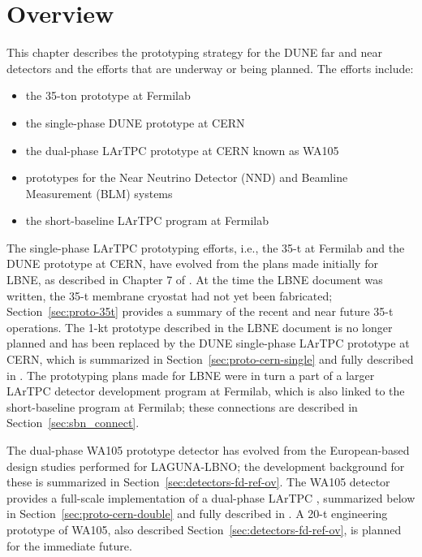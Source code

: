 \section{Overview}
\label{sec:proto-overview}


This chapter describes the prototyping strategy for the DUNE  far and near detectors and the efforts that are underway or being planned.  The efforts include:

\begin{itemize}
\item the 35-ton prototype at Fermilab
\item the single-phase DUNE prototype at CERN
\item the dual-phase LArTPC prototype at CERN known as WA105
\item prototypes for the Near Neutrino Detector (NND) and Beamline Measurement (BLM) systems
\item the short-baseline LArTPC program at Fermilab
\end{itemize}

The single-phase LArTPC prototyping efforts, i.e., the 35-t at Fermilab and the DUNE prototype at CERN, have evolved from the plans made initially for LBNE, as described in Chapter 7 of \anxlbnefd.  At the time the LBNE document was written, the 35-t membrane cryostat had not yet been fabricated; Section~\ref{sec:proto-35t} provides a summary of the recent and near future 35-t operations.  The 1-kt prototype described in the LBNE document is no longer planned and has been replaced by the DUNE single-phase LArTPC prototype at CERN, which is summarized in Section~\ref{sec:proto-cern-single} and fully described in \anxcernproto.  The prototyping plans made for LBNE were in turn a part of a larger LArTPC detector development program at Fermilab, which is also linked to the short-baseline program at Fermilab; these connections are described in Section~\ref{sec:sbn_connect}.

The dual-phase WA105 prototype detector has evolved from the European-based design studies performed for LAGUNA-LBNO; the development background for these is summarized %
in Section~\ref{sec:detectors-fd-ref-ov}.  The WA105 detector provides a full-scale implementation of a dual-phase LArTPC , summarized below in Section~\ref{sec:proto-cern-double} and fully described in  \anxdualtdr.  A 20-t engineering prototype of WA105, also described Section~\ref{sec:detectors-fd-ref-ov}, %
is planned for the immediate future.

